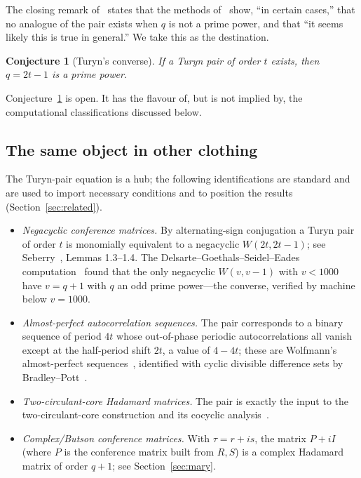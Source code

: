 \documentclass[11pt]{article}
\theoremstyle{plain}
\newtheorem{conjecture}[theorem]{Conjecture}
\theoremstyle{definition}
\theoremstyle{remark}
\begin{document}
The closing remark of~\cite{Turyn72} states that the methods of~\cite{Turyn68}
show, ``in certain cases,'' that no analogue of the pair exists when $q$ is not
a prime power, and that ``it seems likely this is true in general.'' We take
this as the destination.

\begin{conjecture}[Turyn's converse]\label{conj:converse}
If a Turyn pair of order $t$ exists, then $q=2t-1$ is a prime power.
\end{conjecture}

Conjecture~\ref{conj:converse} is open. It has the flavour of, but is not
implied by, the computational classifications discussed below.

\subsection{The same object in other clothing}\label{sec:dictionary-intro}

The Turyn-pair equation is a hub; the following identifications are standard and
are used to import necessary conditions and to position the results
(Section~\ref{sec:related}).
\begin{itemize}
\item \emph{Negacyclic conference matrices.} By alternating-sign conjugation a
  Turyn pair of order $t$ is monomially equivalent to a negacyclic $W(2t,2t-1)$;
  see Seberry~\cite{Seberry16}, Lemmas 1.3--1.4. The
  Delsarte--Goethals--Seidel--Eades computation~\cite{DGS71,Seberry16} found
  that the only negacyclic $W(v,v-1)$ with $v<1000$ have $v=q+1$ with $q$ an
  odd prime power---the converse, verified by machine below $v=1000$.
\item \emph{Almost-perfect autocorrelation sequences.} The pair corresponds to
  a binary sequence of period $4t$ whose out-of-phase periodic autocorrelations
  all vanish except at the half-period shift $2t$, a value of $4-4t$; these are
  Wolfmann's almost-perfect sequences~\cite{Wolfmann92}, identified with cyclic
  divisible difference sets by Bradley--Pott~\cite{PB95}.
\item \emph{Two-circulant-core Hadamard matrices.} The pair is exactly the input
  to the two-circulant-core construction and its cocyclic analysis~\cite{BAOD22}.
\item \emph{Complex/Butson conference matrices.} With $\tau=r+is$, the matrix
  $P+iI$ (where $P$ is the conference matrix built from $R,S$) is a complex
  Hadamard matrix of order $q+1$; see Section~\ref{sec:mary}.
\end{itemize}
\end{document}
